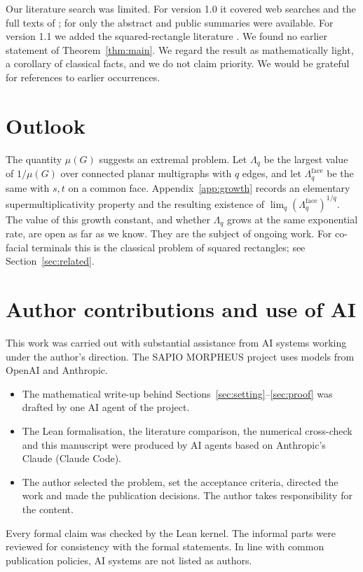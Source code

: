 \documentclass[11pt]{amsart}
\theoremstyle{plain}
\theoremstyle{definition}
\theoremstyle{remark}
\begin{document}
Our literature search was limited. For version 1.0 it covered web searches and the full texts of
\cite{CKP25,CKP24}; for \cite{BuPan} only the abstract and public summaries were available. For version 1.1 we
added the squared-rectangle literature \cite{BSST,Conway,Kenyon,Fomin,Keleti}. We found no earlier statement of Theorem~\ref{thm:main}. We regard the
result as mathematically light, a corollary of classical facts, and we do not claim priority. We would be grateful
for references to earlier occurrences.

\section{Outlook}

The quantity $\mu(G)$ suggests an extremal problem. Let $\Lambda_q$ be the largest value of $1/\mu(G)$ over connected
planar multigraphs with $q$ edges, and let $\Lambda^{\mathrm{face}}_q$ be the same with $s,t$ on a common face.
Appendix~\ref{app:growth} records an elementary supermultiplicativity property and the resulting existence of
$\lim_q(\Lambda^{\mathrm{face}}_q)^{1/q}$. The value of this growth constant, and whether $\Lambda_q$ grows at the
same exponential rate, are open as far as we know. They are the subject of ongoing work. For co-facial terminals
this is the classical problem of squared rectangles; see Section~\ref{sec:related}.

\section*{Author contributions and use of AI}
This work was carried out with substantial assistance from AI systems working under the author's direction. The
SAPIO MORPHEUS project uses models from OpenAI and Anthropic.
\begin{itemize}
\item The mathematical write-up behind Sections~\ref{sec:setting}--\ref{sec:proof} was drafted by one AI agent of
  the project.
\item The Lean formalisation, the literature comparison, the numerical cross-check and this manuscript were
  produced by AI agents based on Anthropic's Claude (Claude Code).
\item The author selected the problem, set the acceptance criteria, directed the work and made the publication
  decisions. The author takes responsibility for the content.
\end{itemize}
Every formal claim was checked by the Lean kernel. The informal parts were reviewed for consistency with the
formal statements. In line with common publication policies, AI systems are not listed as authors.
\end{document}
